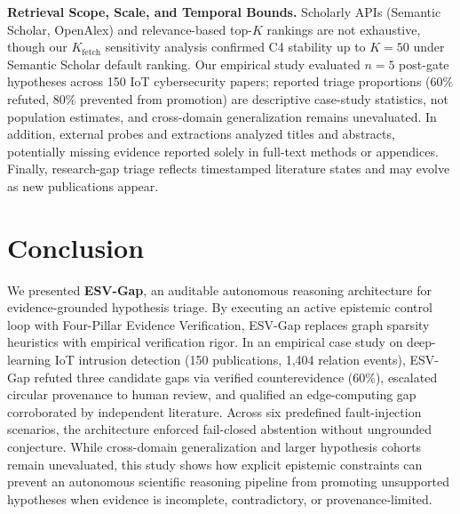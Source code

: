 \documentclass[runningheads]{llncs}
\newcommand{\method}{ESV-Gap}
\providecommand{\doi}[1]{}
\renewcommand{\doi}[1]{\href{https://doi.org/#1}{\texttt{\scriptsize doi:#1}}}
\begin{document}
\noindent\textbf{Retrieval Scope, Scale, and Temporal Bounds.} Scholarly APIs (Semantic Scholar, OpenAlex) and relevance-based top-$K$ rankings are not exhaustive, though our $K_{\text{fetch}}$ sensitivity analysis confirmed C4 stability up to $K=50$ under Semantic Scholar default ranking. Our empirical study evaluated $n=5$ post-gate hypotheses across 150 IoT cybersecurity papers; reported triage proportions ($60\%$ refuted, $80\%$ prevented from promotion) are descriptive case-study statistics, not population estimates, and cross-domain generalization remains unevaluated. In addition, external probes and extractions analyzed titles and abstracts, potentially missing evidence reported solely in full-text methods or appendices. Finally, research-gap triage reflects timestamped literature states and may evolve as new publications appear.

\section{Conclusion}
\label{sec:conclusion}

We presented \textbf{\method{}}, an auditable autonomous reasoning architecture for evidence-grounded hypothesis triage. By executing an active epistemic control loop with Four-Pillar Evidence Verification, \method{} replaces graph sparsity heuristics with empirical verification rigor. In an empirical case study on deep-learning IoT intrusion detection (150 publications, 1,404 relation events), \method{} refuted three candidate gaps via verified counterevidence ($60\%$), escalated circular provenance to human review, and qualified an edge-computing gap corroborated by independent literature. Across six predefined fault-injection scenarios, the architecture enforced fail-closed abstention without ungrounded conjecture. While cross-domain generalization and larger hypothesis cohorts remain unevaluated, this study shows how explicit epistemic constraints can prevent an autonomous scientific reasoning pipeline from promoting unsupported hypotheses when evidence is incomplete, contradictory, or provenance-limited.

\let\oldthebibliography\thebibliography
\let\endoldthebibliography\endthebibliography
\renewenvironment{thebibliography}[1]{%
  \begin{oldthebibliography}{#1}%
    \def\doi##1{\href{https://doi.org/##1}{\nolinkurl{doi:##1}}}%
    \setlength{\itemsep}{-5.5pt plus 0.2pt}%
    \setlength{\parsep}{0pt}%
}{%
  \end{oldthebibliography}%
}



\end{document}
